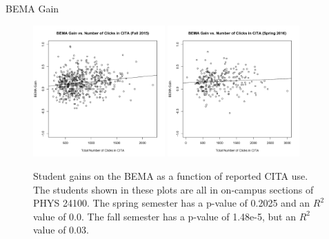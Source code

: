 \documentclass[xcolor=x11names,compress]{beamer}
\begin{document}
\begin{frame}{BEMA Gain}
\begin{figure}[ht]
\centering
\includegraphics[width=0.45\textwidth]{img/bema_fa15_gain.pdf}
\includegraphics[width=0.45\textwidth]{img/bema_sp16_gain.pdf}
\caption{Student gains on the BEMA as a function of reported CITA use. The students shown in these plots are all in on-campus sections of PHYS 24100. The spring semester has a p-value of 0.2025 and an $R^2$ value of 0.0. The fall semester has a p-value of 1.48e-5, but an $R^2$ value of 0.03.}
\end{figure}
\end{frame}
\end{document}
